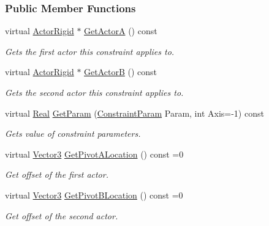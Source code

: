 \subsubsection*{Public Member Functions}
\begin{DoxyCompactItemize}
\item 
virtual \hyperlink{classphys_1_1ActorRigid}{ActorRigid} $\ast$ \hyperlink{classphys_1_1TypedConstraint_a5c61e6413fb263c959881144ff313f09}{GetActorA} () const 
\begin{DoxyCompactList}\small\item\em Gets the first actor this constraint applies to. \item\end{DoxyCompactList}\item 
virtual \hyperlink{classphys_1_1ActorRigid}{ActorRigid} $\ast$ \hyperlink{classphys_1_1TypedConstraint_a6e8d67caa4401bfda64d12439444ce7b}{GetActorB} () const 
\begin{DoxyCompactList}\small\item\em Gets the second actor this constraint applies to. \item\end{DoxyCompactList}\item 
virtual \hyperlink{namespacephys_af7eb897198d265b8e868f45240230d5f}{Real} \hyperlink{classphys_1_1TypedConstraint_aea72af5774674e6628a1413668fb4ab8}{GetParam} (\hyperlink{namespacephys_aa1e7cf2d7efcaeaeac304f711e7564e8}{ConstraintParam} Param, int Axis=-\/1) const 
\begin{DoxyCompactList}\small\item\em Gets value of constraint parameters. \item\end{DoxyCompactList}\item 
virtual \hyperlink{classphys_1_1Vector3}{Vector3} \hyperlink{classphys_1_1TypedConstraint_af9827f1d4c7bcfb201d43d3dcf03cdfd}{GetPivotALocation} () const =0
\begin{DoxyCompactList}\small\item\em Get offset of the first actor. \item\end{DoxyCompactList}\item 
virtual \hyperlink{classphys_1_1Vector3}{Vector3} \hyperlink{classphys_1_1TypedConstraint_ad1d8e9e2ab17579bd6c13ee8c4acf20b}{GetPivotBLocation} () const =0
\begin{DoxyCompactList}\small\item\em Get offset of the second actor. \item\end{DoxyCompactList}\item 

\end{DoxyCompactItemize}
